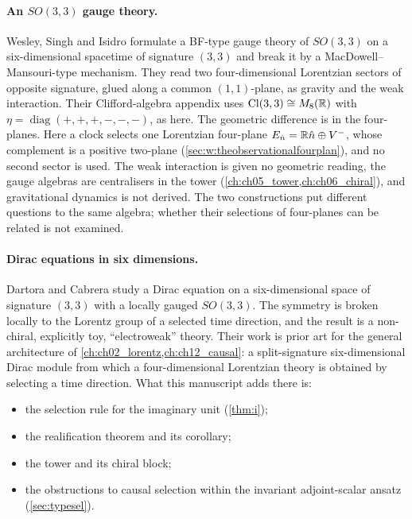 \paragraph{An \texorpdfstring{$SO(3,3)$}{SO(3,3)} gauge theory.} Wesley, Singh and Isidro \cite{WesleySinghIsidro26} formulate a BF-type
gauge theory of $SO(3,3)$ on a six-dimensional spacetime of signature $(3,3)$ and break it by a MacDowell--Mansouri-type mechanism. They read
two four-dimensional Lorentzian sectors of opposite signature, glued along a common $(1,1)$-plane, as gravity and the weak interaction. Their
Clifford-algebra appendix uses $\mathrm{Cl}(3,3)\cong M_8(\mathbb{R})$ with $\eta=\operatorname{diag}(+,+,+,-,-,-)$, as here. The geometric difference is in
the four-planes. Here a clock selects one Lorentzian four-plane $E_{\hat n}=\mathbb{R}\hat n\oplus V^-$, whose complement is a positive two-plane
(\cref{sec:w:theobservationalfourplan}), and no second sector is used. The weak interaction is given no geometric reading, the gauge
algebras are centralisers in the tower (\cref{ch:ch05_tower,ch:ch06_chiral}), and gravitational dynamics is not derived. The two
constructions put different questions to the same algebra; whether their selections of four-planes can be related is not examined.

\paragraph{Dirac equations in six dimensions.} Dartora and Cabrera \cite{DartoraCabrera10} study a Dirac equation on a six-dimensional space
of signature $(3,3)$ with a locally gauged $SO(3,3)$. The symmetry is broken locally to the Lorentz group of a selected time direction, and
the result is a non-chiral, explicitly toy, ``electroweak'' theory. Their work is prior art for the general architecture of
\cref{ch:ch02_lorentz,ch:ch12_causal}: a split-signature six-dimensional Dirac module from which a four-dimensional Lorentzian theory is
obtained by selecting a time direction. What this manuscript adds there is:
\begin{itemize}
\item the selection rule for the imaginary unit (\cref{thm:i});
\item the realification theorem and its corollary;
\item the tower and its chiral block;
\item the obstructions to causal selection within the invariant adjoint-scalar ansatz (\cref{sec:typesel}).
\end{itemize}

